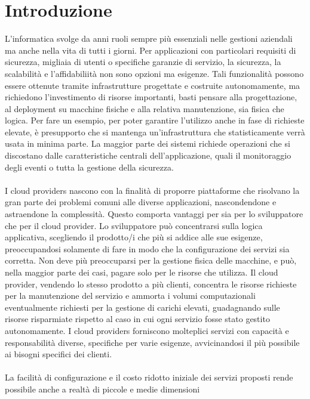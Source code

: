 \section*{Introduzione}
L'informatica svolge da anni ruoli sempre più essenziali nelle gestioni aziendali ma anche nella vita di tutti i giorni. 
Per applicazioni con particolari requisiti di sicurezza, migliaia di utenti o specifiche garanzie di servizio, la sicurezza, 
la scalabilità e l'affidabiliità non sono opzioni ma esigenze. 
Tali funzionalità possono essere ottenute tramite infrastrutture progettate e costruite autonomamente, 
ma richiedono l'investimento di risorse importanti, basti pensare alla progettazione, al deployment su macchine fisiche e alla relativa manutenzione, sia fisica che logica.
Per fare un esempio, per poter garantire l'utilizzo anche in fase di richieste elevate, è presupporto che si mantenga un'infrastruttura che statisticamente verrà usata in minima parte.
La maggior parte dei sistemi richiede operazioni che si discostano dalle caratteristiche centrali dell'applicazione, 
quali il monitoraggio degli eventi o tutta la gestione della sicurezza.\\
\\
I cloud providers nascono con la finalità di proporre piattaforme che risolvano la gran parte dei problemi comuni alle diverse applicazioni,
nascondendone e astraendone la complessità.
Questo comporta vantaggi per sia per lo sviluppatore che per il cloud provider. 
Lo sviluppatore può concentrarsi sulla logica applicativa, scegliendo il prodotto/i che più si addice alle sue esigenze, 
preoccupandosi solamente di fare in modo che la configurazione dei servizi sia corretta. 
Non deve più preoccuparsi per la gestione fisica delle macchine, e può, nella maggior parte dei casi, pagare solo per le risorse che utilizza.
Il cloud provider, vendendo lo stesso prodotto a più clienti, concentra le risorse richieste per la manutenzione del servizio
e ammorta i volumi computazionali eventualmente richiesti per la gestione di carichi elevati, 
guadagnando sulle risorse risparmiate rispetto al caso in cui ogni servizio fosse stato gestito autonomamente.
I cloud providers forniscono molteplici servizi con capacità e responsabilità diverse, specifiche per varie esigenze, 
avvicinandosi il più possibile ai bisogni specifici dei clienti.\\
\\
La facilità di configurazione e il costo ridotto iniziale dei servizi proposti rende possibile anche a realtà di piccole e medie dimensioni 
